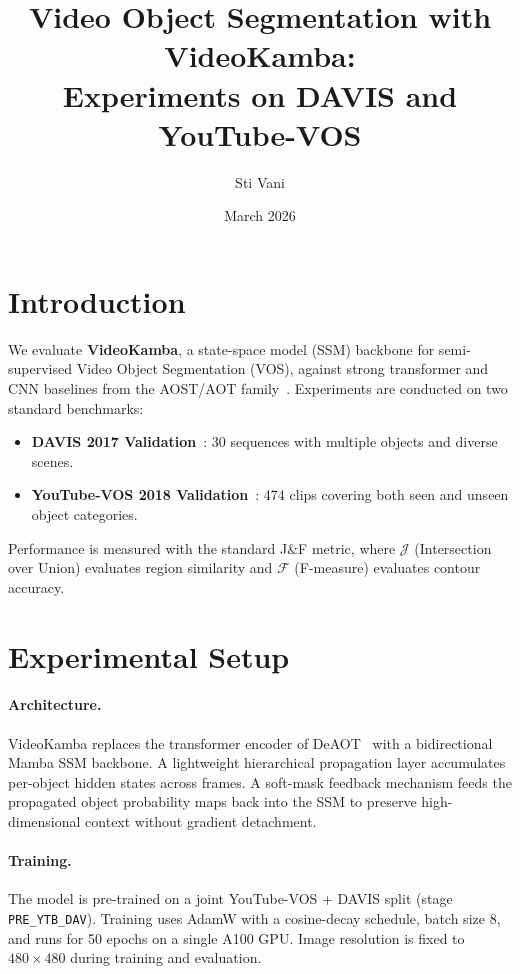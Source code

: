 \documentclass[11pt,a4paper]{article}
\title{\textbf{Video Object Segmentation with VideoKamba:\\
        Experiments on DAVIS and YouTube-VOS}}
\author{Sti Vani}
\date{March 2026}
\begin{document}
\maketitle

\section{Introduction}
\label{sec:intro}

We evaluate \textbf{VideoKamba}, a state-space model (SSM) backbone for
semi-supervised Video Object Segmentation (VOS), against strong transformer and
CNN baselines from the AOST/AOT family~\cite{yang2022decoupling}.
Experiments are conducted on two standard benchmarks:
\begin{itemize}
  \item \textbf{DAVIS 2017 Validation}~\cite{pont2016davis}: 30 sequences with
        multiple objects and diverse scenes.
  \item \textbf{YouTube-VOS 2018 Validation}~\cite{xu2018youtube}: 474 clips
        covering both seen and unseen object categories.
\end{itemize}

Performance is measured with the standard J\&F metric,
where $\mathcal{J}$ (Intersection over Union) evaluates region similarity and
$\mathcal{F}$ (F-measure) evaluates contour accuracy.

\section{Experimental Setup}
\label{sec:setup}

\paragraph{Architecture.}
VideoKamba replaces the transformer encoder of DeAOT~\cite{yang2022decoupling}
with a bidirectional Mamba SSM backbone.  A lightweight
hierarchical propagation layer accumulates per-object hidden states across
frames.  A soft-mask feedback mechanism feeds the propagated object probability
maps back into the SSM to preserve high-dimensional context without gradient
detachment.

\paragraph{Training.}
The model is pre-trained on a joint YouTube-VOS + DAVIS split (stage
\texttt{PRE\_YTB\_DAV}).  Training uses AdamW with a cosine-decay schedule,
batch size 8, and runs for 50 epochs on a single A100 GPU.  Image resolution
is fixed to $480\!\times\!480$ during training and evaluation.
\end{document}
